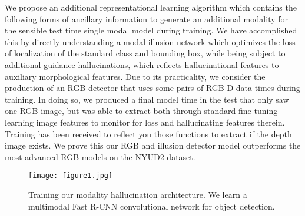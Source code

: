 \documentclass[10pt,twocolumn,letterpaper]{article}
\begin{document}
\par We propose an additional representational learning algorithm which contains the following forms of ancillary information to generate an additional modality for the sensible test time single modal model during training. We have accomplished this by directly understanding a modal illusion network which optimizes the loss of localization of the standard class and bounding box, while being subject to additional guidance hallucinations, which reflects hallucinational features to auxiliary morphological features. Due to its practicality, we consider the production of an RGB detector that uses some pairs of RGB-D data times during training. In doing so, we produced a final model time in the test that only saw one RGB image, but was able to extract both through standard fine-tuning learning image features to monitor for loss and hallucinating features therein. Training has been received to reflect you those functions to extract if the depth image exists. We prove this our RGB and illusion detector model outperforms the most advanced RGB models on the NYUD2 dataset.
\begin{figure}
	\centering
	\texttt{[image: figure1.jpg]}
	\caption{Training our modality hallucination architecture.
		We learn a multimodal Fast R-CNN convolutional network
		for object detection. }\label{pic1}
\end{figure}
\end{document}
